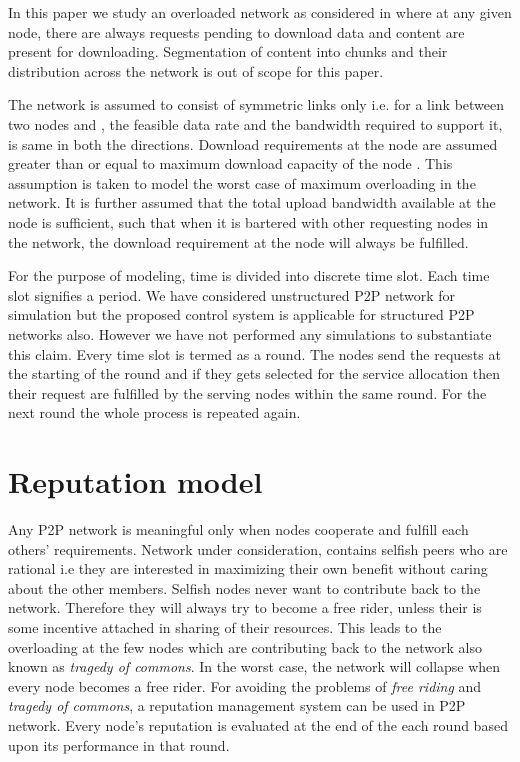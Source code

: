 \documentclass[journal]{IEEEtran}
\begin{document}
In this paper we study an overloaded network as considered in \cite{Satsiou}\cite{RationalMalicious} where at any given node, there are always requests pending to download data and content are present for downloading. Segmentation of content into chunks and their distribution across the network is out of scope for this paper.

The network is assumed to consist of symmetric links only i.e. for a link between two nodes  and , the feasible data rate and the bandwidth required to support it, is same  in both the directions. Download requirements at the node  are assumed greater than or equal to maximum download capacity of the node . This assumption is taken to model the worst case  of maximum overloading in the network. It is further assumed that the total upload bandwidth  available at the node  is sufficient, such that when it is bartered with other requesting nodes in the network, the download requirement at the node  will always be fulfilled. 

For the purpose of modeling, time is divided into discrete time slot. Each time slot signifies a period. We have considered unstructured P2P network for simulation but the proposed control system is applicable for structured P2P networks also. However we have not performed any simulations  to substantiate this claim. Every time slot is termed as a round. The nodes send the requests at the starting of the round and if they gets selected for the service allocation then their request are fulfilled by the serving nodes within the same round. For the next round the whole process is repeated again.  

\section{Reputation model}
\label{Reputation_model}
Any P2P network is meaningful only when nodes cooperate and fulfill each others' requirements. Network under consideration, contains selfish peers who are rational i.e they are interested in maximizing their own benefit without caring about the other members. Selfish nodes never want to contribute back to the network. Therefore they will always try to become a free rider, unless their is some incentive attached in sharing of their resources. This leads to the overloading at the few nodes which are contributing back to the network also known as \emph{tragedy of commons}. In the worst case, the network will collapse  when  every node becomes a free rider. For avoiding the problems of \emph{free riding} and \emph{tragedy of commons}, a reputation management system can be used in P2P network. Every node's reputation is evaluated at the end of the each round based upon its performance in that round. 	
\end{document}
